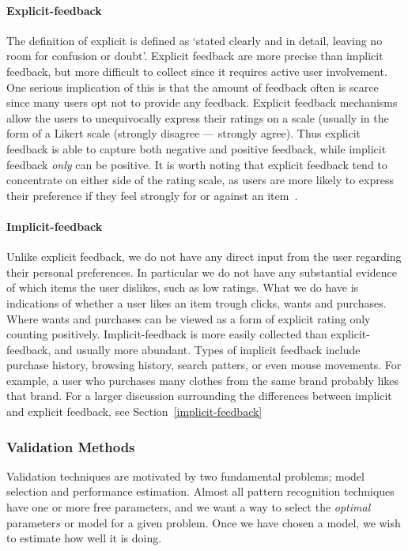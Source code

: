 \paragraph{Explicit-feedback}
The definition of explicit is defined as `stated clearly and in detail, leaving
no room for confusion or doubt'. Explicit feedback are more precise than
implicit feedback, but more difficult to collect since it requires active user
involvement. One serious implication of this is that the amount of feedback
often is scarce since many users opt not to provide any feedback. Explicit
feedback mechanisms allow the users to unequivocally express their ratings on a
scale (usually in the form of a Likert scale (strongly disagree --- strongly
agree). Thus explicit feedback is able to capture both negative and positive
feedback, while implicit feedback \emph{only} can be positive. It is worth
noting that explicit feedback tend to concentrate on either side of the rating
scale, as users are more likely to express their preference if they feel
strongly for or against an item~\cite{Jawaheer2010}.

\paragraph{Implicit-feedback}
Unlike explicit feedback, we do not have any direct input from the user
regarding their personal preferences. In particular we do not have any
substantial evidence of which items the user dislikes, such as low ratings.
What we do have is indications of whether a user likes an item trough clicks, wants and purchases. Where wants and purchases can be viewed as a form of explicit rating only counting positively.
Implicit-feedback is more easily collected than explicit-feedback, and usually more abundant.
Types of implicit feedback include purchase history, browsing history,
search patters, or even mouse movements. For example, a user who purchases
many clothes from the same brand probably likes that brand. For a larger
discussion surrounding the differences between implicit and explicit
feedback, see Section~\ref{implicit-feedback}

\subsubsection{Validation Methods}
Validation techniques are motivated by two fundamental problems; model
selection and performance estimation. Almost all pattern recognition techniques
have one or more free parameters, and we want a way to select the
\emph{optimal} parameter\(s\) or model for a given problem. Once we have chosen a
model, we wish to estimate how well it is doing.

